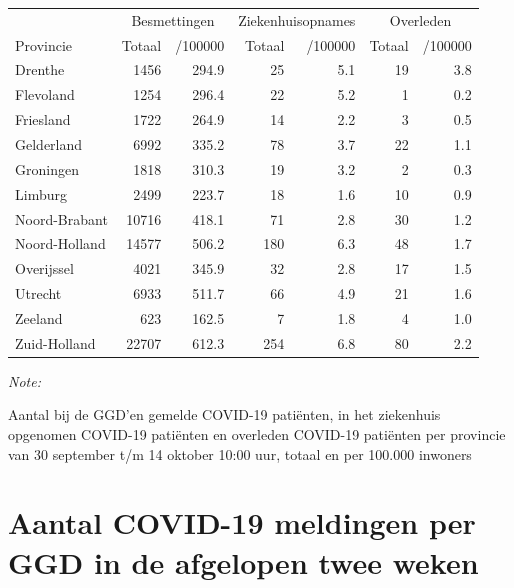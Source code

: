 \documentclass[
  english,
  man,floatsintext]{apa6}
\begin{document}
\begin{table}[H]
\centering
\begin{threeparttable}
\begin{tabular}{lrrrrrr}
\toprule
\multicolumn{1}{c}{ } & \multicolumn{2}{c}{Besmettingen} & \multicolumn{2}{c}{Ziekenhuisopnames} & \multicolumn{2}{c}{Overleden} \\
\cmidrule(l{3pt}r{3pt}){2-3} \cmidrule(l{3pt}r{3pt}){4-5} \cmidrule(l{3pt}r{3pt}){6-7}
Provincie & Totaal & /100000 & Totaal & /100000 & Totaal & /100000\\
\midrule
Drenthe & 1456 & 294.9 & 25 & 5.1 & 19 & 3.8\\
Flevoland & 1254 & 296.4 & 22 & 5.2 & 1 & 0.2\\
Friesland & 1722 & 264.9 & 14 & 2.2 & 3 & 0.5\\
Gelderland & 6992 & 335.2 & 78 & 3.7 & 22 & 1.1\\
Groningen & 1818 & 310.3 & 19 & 3.2 & 2 & 0.3\\
Limburg & 2499 & 223.7 & 18 & 1.6 & 10 & 0.9\\
Noord-Brabant & 10716 & 418.1 & 71 & 2.8 & 30 & 1.2\\
Noord-Holland & 14577 & 506.2 & 180 & 6.3 & 48 & 1.7\\
Overijssel & 4021 & 345.9 & 32 & 2.8 & 17 & 1.5\\
Utrecht & 6933 & 511.7 & 66 & 4.9 & 21 & 1.6\\
Zeeland & 623 & 162.5 & 7 & 1.8 & 4 & 1.0\\
Zuid-Holland & 22707 & 612.3 & 254 & 6.8 & 80 & 2.2\\
\bottomrule
\end{tabular}
\begin{tablenotes}
\item \textit{Note: } 
\item Aantal bij de GGD’en gemelde COVID-19 patiënten, in het ziekenhuis opgenomen COVID-19 patiënten en overleden COVID-19 patiënten per provincie van 30 september t/m 14 oktober 10:00 uur, totaal en per 100.000 inwoners
\end{tablenotes}
\end{threeparttable}
\end{table}

\newpage

\hypertarget{aantal-covid-19-meldingen-per-ggd-in-de-afgelopen-twee-weken}{%
\section{Aantal COVID-19 meldingen per GGD in de afgelopen twee weken}\label{aantal-covid-19-meldingen-per-ggd-in-de-afgelopen-twee-weken}}
\end{document}
